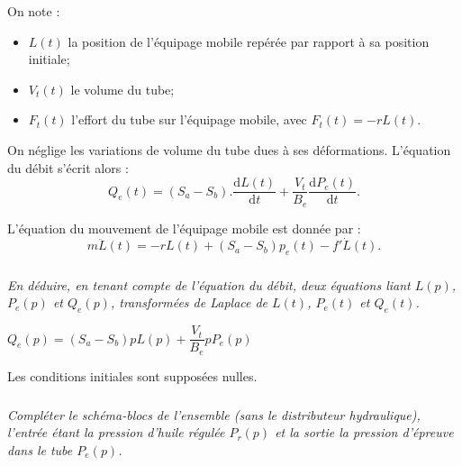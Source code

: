 


\ifprof
\else


On note :
\begin{itemize}
	\item $L(t)$ la position de l’équipage mobile repérée par rapport à sa position initiale;
	\item $V_t(t)$ le volume du tube;
	\item $F_t(t)$ l’effort du tube sur l’équipage mobile, avec $F_t(t) = - rL(t)$.
\end{itemize}

On néglige les variations de volume du tube dues à ses déformations. L’équation du débit s’écrit alors :
	$$Q_e (t)=(S_a-S_b ).\dfrac{\text{d}L(t)}{\text{d}t}+\dfrac{V_t}{B_e}  \dfrac{\text{d}P_e (t)}{\text{d}t}.$$


L’équation du mouvement de l’équipage mobile est donnée par : 
$$
m\ddot{L}(t)=-rL(t)+\left(S_a-S_b \right)p_e(t)-f'\dot{L}(t).
$$

\fi
\subparagraph{}
\textit{En déduire, en tenant compte de l’équation du débit, deux équations liant $L(p)$, $P_e(p)$ et $Q_e(p)$, transformées de Laplace de $L(t)$, $P_e(t)$ et $Q_e(t)$. }
\ifprof
\begin{corrige}
	$Q_e (p)=(S_a-S_b )p L(p)+\dfrac{V_t}{B_e}  p P_e(p)$
\end{corrige}
\else
\fi
Les conditions initiales sont supposées nulles.

\subparagraph{}
\textit{Compléter le schéma-blocs de l’ensemble (sans le distributeur hydraulique), l’entrée étant la pression d’huile régulée $P_r(p)$ et la sortie la pression d’épreuve dans le tube $P_e(p)$.}
\ifprof
\begin{corrige}
\end{corrige}
\else
\fi


\begin{center}
\end{center}
